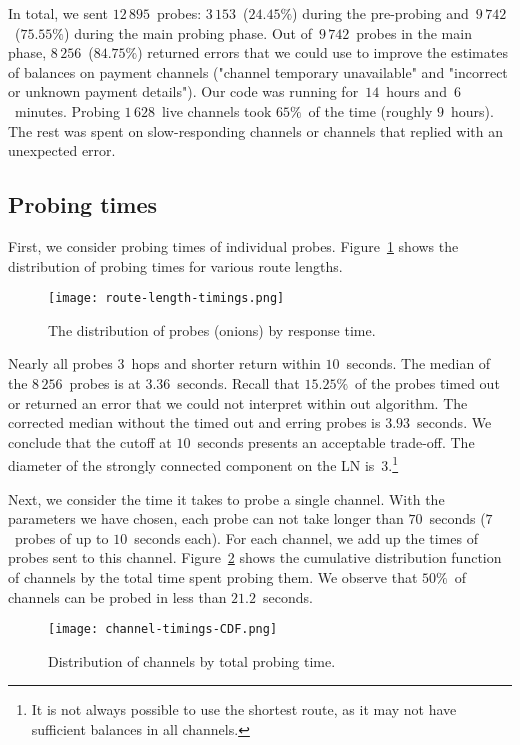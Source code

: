 In total, we sent $12\,895$~probes: $3\,153$~($24.45\%$) during the pre-probing and~$9\,742$~($75.55\%$) during the main probing phase.
Out of~$9\,742$~probes in the main phase, $8\,256$~($84.75\%$) returned errors that we could use to improve the estimates of balances on payment channels ("channel temporary unavailable" and "incorrect or unknown payment details").
Our code was running for~$14$~hours and~$6$~minutes. %
Probing $1\,628$~live channels took $65\%$~of the time (roughly $9$~hours).
The rest was spent on slow-responding channels or channels that replied with an unexpected error.


\subsection{Probing times}

First, we consider probing times of individual probes.
Figure~\ref{fig:route-length-timings} shows the distribution of probing times for various route lengths.

\begin{figure}[ht]
	\centering
	\texttt{[image: route-length-timings.png]}
	\caption{The distribution of probes (onions) by response time.}
	\label{fig:route-length-timings}
\end{figure}

Nearly all probes $3$~hops and shorter return within $10$~seconds.
The median of the $8\,256$~probes is at $3.36$~seconds.
Recall that $15.25\%$~of the probes timed out or returned an error that we could not interpret within out algorithm.
The corrected median without the timed out and erring probes is $3.93$~seconds. 
We conclude that the cutoff at $10$~seconds presents an acceptable trade-off.
The diameter of the strongly connected component on the LN is~$3$.\footnote{It is not always possible to use the shortest route, as it may not have sufficient balances in all channels.}

Next, we consider the time it takes to probe a single channel.
With the parameters we have chosen, each probe can not take longer than $70$~seconds ($7$~probes of up to $10$~seconds each).
For each channel, we add up the times of probes sent to this channel.
Figure~\ref{fig:channel-timings-CDF} shows the cumulative distribution function of channels by the total time spent probing them.
We observe that $50\%$~of channels can be probed in less than $21.2$~seconds.

\begin{figure}[ht]
	\centering
	\texttt{[image: channel-timings-CDF.png]}
	\caption{Distribution of channels by total probing time.}
	\label{fig:channel-timings-CDF}
\end{figure}


